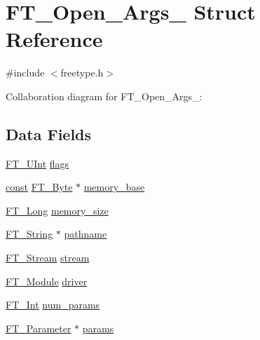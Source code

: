 \hypertarget{struct_f_t___open___args__}{}\section{F\+T\+\_\+\+Open\+\_\+\+Args\+\_\+ Struct Reference}
\label{struct_f_t___open___args__}


{\ttfamily \#include $<$freetype.\+h$>$}



Collaboration diagram for F\+T\+\_\+\+Open\+\_\+\+Args\+\_\+\+:
\subsection*{Data Fields}
\begin{DoxyCompactItemize}
\item 
\hyperlink{fttypes_8h_abcb8db4dbf35d2b55a9e8c7b0926dc52}{F\+T\+\_\+\+U\+Int} \hyperlink{struct_f_t___open___args___a2e3e6b9284fe8b4d9833e247a19181fa}{flags}
\item 
\hyperlink{zconf_8h_a2c212835823e3c54a8ab6d95c652660e}{const} \hyperlink{fttypes_8h_a51f26183ca0c9f4af958939648caeccd}{F\+T\+\_\+\+Byte} $\ast$ \hyperlink{struct_f_t___open___args___a1231da51bc58922096b3bc603bb2ffb0}{memory\+\_\+base}
\item 
\hyperlink{fttypes_8h_a7fa72a1f0e79fb1860c5965789024d6f}{F\+T\+\_\+\+Long} \hyperlink{struct_f_t___open___args___a87f0bb2f257abe94c93a79e0de3525da}{memory\+\_\+size}
\item 
\hyperlink{fttypes_8h_a9846214585359eb2ba6bbb0e6de30639}{F\+T\+\_\+\+String} $\ast$ \hyperlink{struct_f_t___open___args___aea3d454d9fd9bb7434aad07e651d027b}{pathname}
\item 
\hyperlink{ftsystem_8h_a788b32c932932f7411a8dfa7f6c794bf}{F\+T\+\_\+\+Stream} \hyperlink{struct_f_t___open___args___ae1e6444bf0c21b323ce6cbe8bc475b2b}{stream}
\item 
\hyperlink{freetype_8h_a660c1bb333747abacdc433b7d73ca59b}{F\+T\+\_\+\+Module} \hyperlink{struct_f_t___open___args___a7c01bd7e34a440c3e89141ee521e2646}{driver}
\item 
\hyperlink{fttypes_8h_af90e5fb0d07e21be9fe6faa33f02484c}{F\+T\+\_\+\+Int} \hyperlink{struct_f_t___open___args___afaf47d9e1631f2147b696fd7f5a6f4eb}{num\+\_\+params}
\item 
\hyperlink{freetype_8h_a0b96ed5cf9b897c90409981c43633d55}{F\+T\+\_\+\+Parameter} $\ast$ \hyperlink{struct_f_t___open___args___a77b279a34beba29bc14901926f79818f}{params}
\end{DoxyCompactItemize}


